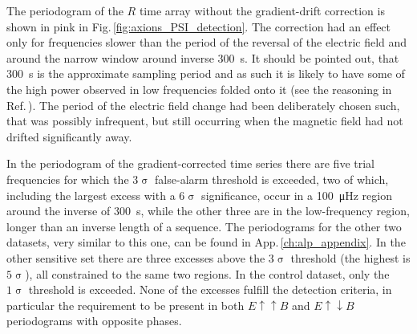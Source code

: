 The periodogram of the $R$ time array without the gradient-drift correction is shown in pink in Fig.\,\ref{fig:axions_PSI_detection}. The correction had an effect only for frequencies slower than the period of the reversal of the electric field and around the narrow window around inverse \SI{300}{\second}. It should be pointed out, that \SI{300}{\second} is the approximate sampling period and as such it is likely to have some of the high power observed in low frequencies folded onto it (see the reasoning in Ref.\,\cite{Shannon1949}). The period of the electric field change had been deliberately chosen such, that was possibly infrequent, but still occurring when the magnetic field had not drifted significantly away.

In the periodogram of the gradient-corrected time series there are five
trial frequencies for which the $3\upsigma$ false-alarm threshold is exceeded,
two of which, including the largest excess with a $6\upsigma$ significance, occur in a \SI{100}{\micro\hertz} region around the inverse of \SI{300}{\second}, while the other three are in the low-frequency region, longer than an inverse length of a sequence.
 The periodograms for the other two datasets, very similar to this one, can be found in App.\,\ref{ch:alp_appendix}.
In the other sensitive set there are three excesses above the $3\upsigma$ threshold (the highest is $5\upsigma$), all constrained to the same two regions. In the control dataset, only the $1\upsigma$ threshold is exceeded. None of the excesses fulfill the detection criteria, in particular the requirement to be present in both $E \uparrow \uparrow B$ and $E \uparrow \downarrow B$ periodograms with opposite phases.


